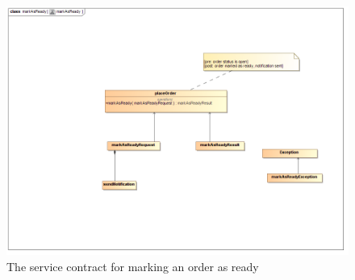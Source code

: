 \documentclass[a4paper,12pt]{report}
\begin{document}
\begin{figure}[H]
	\centering
	\includegraphics[width=1.0\textwidth]{../images/markAsReadySC.png}
	\caption{The service contract for marking an order as ready}
\end{figure}
\end{document}
